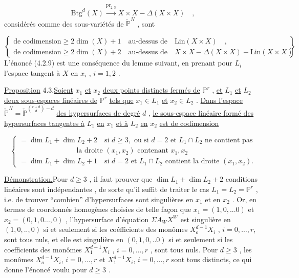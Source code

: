 \begin{equation}\tag{4.2.8}
\mathrm{Btg}^d(X) \stackrel{\mathrm{pr}_{2,3}}{\longrightarrow} X \times X - \Delta(X \times X) \quad ,
\end{equation}
considérés comme des sous-variétés de $\check{\mathbb{P}}^N$ , sont

\begin{equation}\tag{4.2.9}
\left\{
\begin{array}{l}
\mbox{de codimension} \geq 2\dim(X)+1 \quad \mbox{au-dessus de} \quad \mathrm{Lin}(X{\times}X) \quad , \\[2ex]
\mbox{de codimension} \geq 2\dim(X)+2 \quad \mbox{au-dessus de} \quad X{\times}X-\Delta(X{\times}X)-\mathrm{Lin}(X{\times}X)
\end{array}
\right\} \quad .
\end{equation}
L'énoncé (4.2.9) est une conséquence du lemme suivant, en prenant pour $L_i$ l'espace tangent à $X$ en $x_i$ , $i=1,2$ .

\underline{Proposition} 4.3.\quad \underline{Soient} $x_1$ \underline{et} $x_2$ \underline{deux points distincts fermés de} $\mathbb{P}^r$ , \underline{et} $L_1$ \underline{et} $L_2$ \underline{deux sous-espaces linéaires de} $\mathbb{P}^r$ \underline{tels que} $x_1 \in L_1$ \underline{et} $x_2 \in L_2$ . \underline{Dans l'espace} $\check{\mathbb{P}}^N = \check{\mathbb{P}}^{\binom{r+d}{d}-d}$ \underline{des hypersurfaces de degré} $d$ , \underline{le sous-espace linéaire formé des hypersurfaces tangentes à} $L_1$ \underline{en} $x_1$ \underline{et à} $L_2$ \underline{en} $x_2$ \underline{est de codimension}

\begin{equation*}
\left\{
\begin{array}{l}
= \dim L_1+\dim L_2+2 \quad \mbox{si } d\geq 3, \mbox{ ou si } d=2 \mbox{ et } L_1 \cap L_2 \mbox{ ne contient pas} \\[1ex]
\qquad\qquad\qquad\qquad \mbox{la droite } (x_1,x_2) \mbox{ contenant } x_1,x_2 \\[2ex]
= \dim L_1+\dim L_2+1 \quad \mbox{si } d=2 \mbox{ et } L_1 \cap L_2 \mbox{ contient la droite } (x_1,x_2).
\end{array}
\right.
\end{equation*}


\underline{Démonstration.}\quad Pour $d \geq 3$ , il faut prouver que $\dim L_1 + \dim L_2+2$ conditions linéaires sont indépendantes , de sorte qu'il suffit de traiter le cas $L_1 = L_2 = \mathbb{P}^r$ , i.e. de trouver ``combien'' d'hypersurfaces sont singulières en $x_1$ et en $x_2$ . Or, en termes de coordonnés homogènes choisies de telle façon que $x_1 = (1,0,...0)$ et $x_2 = (0,1,0...,0)$ , l'hypersurface d'équation $\Sigma A_W X^W$ est singulière en $(1,0,..,0)$ si et seulement si les coéfficients des monômes $X_o^{d-1}X_i$ , $i=0,\ldots,r$, sont tous nuls, et elle est singulière en $(0,1,0,..0)$ si et seulement si les coefficients des monômes $X_1^{d-1}X_i$ , $i=0,\ldots,r$ , sont tous nuls. Pour $d \geq 3$ , les monômes $X_o^{d-1}X_i$, $i=0,\ldots,r$ et $X_1^{d-1}X_i$, $i=0,\ldots,r$ sont tous distincts, ce qui donne l'énoncé voulu pour $d \geq 3$ .


